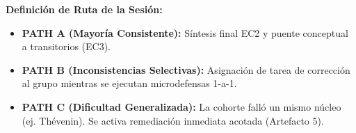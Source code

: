\documentclass[11pt, a4paper]{article}
\begin{document}
\textbf{Definición de Ruta de la Sesión:}
\begin{itemize}
    \item \textbf{PATH A (Mayoría Consistente):} Síntesis final EC2 y puente conceptual a transitorios (EC3).
    \item \textbf{PATH B (Inconsistencias Selectivas):} Asignación de tarea de corrección al grupo mientras se ejecutan microdefensas 1-a-1.
    \item \textbf{PATH C (Dificultad Generalizada):} La cohorte falló un mismo núcleo (ej. Thévenin). Se activa remediación inmediata acotada (Artefacto 5).
\end{itemize}
\end{document}
